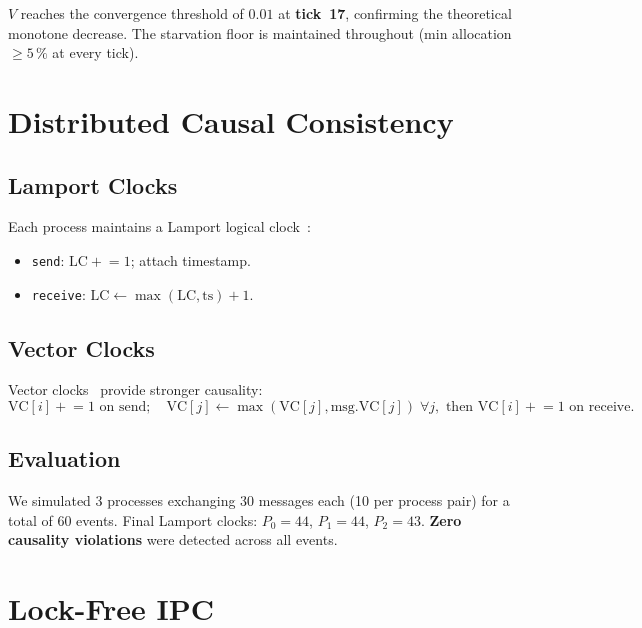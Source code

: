 \documentclass[sigconf]{acmart}
\begin{document}
$V$ reaches the convergence threshold of $0.01$ at \textbf{tick~17},
confirming the theoretical monotone decrease.  The starvation floor is
maintained throughout (min allocation $\geq 5\,\%$ at every tick).

\section{Distributed Causal Consistency}
\label{sec:distributed}

\subsection{Lamport Clocks}

Each process maintains a Lamport logical clock~\cite{lamport1978time}:
\begin{itemize}
  \item \texttt{send}: $\mathrm{LC} \mathrel{+}= 1$; attach timestamp.
  \item \texttt{receive}: $\mathrm{LC} \leftarrow \max(\mathrm{LC}, \mathrm{ts}) + 1$.
\end{itemize}

\subsection{Vector Clocks}

Vector clocks~\cite{fidge1988timestamps} provide stronger causality:
\[
  \mathrm{VC}[i] \mathrel{+}= 1 \text{ on send}; \quad
  \mathrm{VC}[j] \leftarrow \max(\mathrm{VC}[j], \mathrm{msg.VC}[j]) \;\forall j, \text{ then } \mathrm{VC}[i] \mathrel{+}= 1 \text{ on receive.}
\]

\subsection{Evaluation}

We simulated 3 processes exchanging 30 messages each (10 per process pair)
for a total of 60 events.  Final Lamport clocks: $P_0 = 44$, $P_1 = 44$,
$P_2 = 43$.  \textbf{Zero causality violations} were detected across all
events.

\section{Lock-Free IPC}
\label{sec:ipc}
\end{document}
